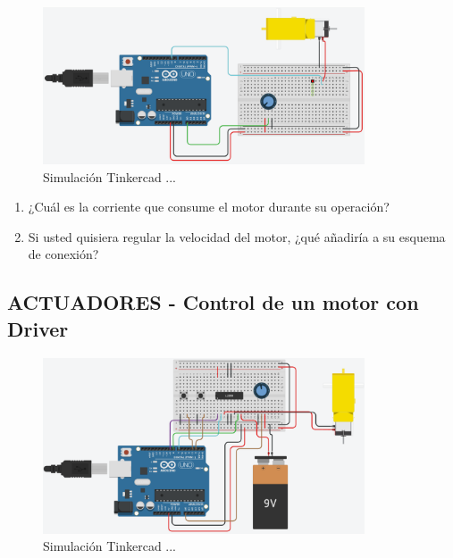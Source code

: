 \documentclass{article}
\begin{document}
\begin{figure}[H]
    \centering
    \includegraphics[width=0.85\textwidth]{./img/ckpt_encendido_motor.png}
    \caption{Simulación Tinkercad ...}
    \label{fig:encendido_motor}
\end{figure}


\begin{enumerate}
    \item ¿Cuál es la corriente que consume el motor durante su operación?
    \item Si usted quisiera regular la velocidad del motor, ¿qué añadiría a su esquema de conexión?
\end{enumerate}

\subsection{ACTUADORES - Control de un motor con Driver}


\begin{figure}[H]
    \centering
    \includegraphics[width=0.85\textwidth]{./img/ckpt_motor_driver.png}
    \caption{Simulación Tinkercad ...}
    \label{fig:motor_driver}
\end{figure}
\end{document}
